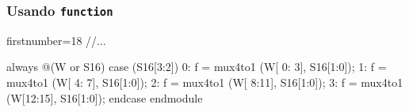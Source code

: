 \begin{frame}[fragile]
	\frametitle{Usando \texttt{function}}
	\begin{verilogcode*}{firstnumber=18}
//...
  
  always @(W or S16) 
    case (S16[3:2])
      0: f = mux4to1 (W[ 0: 3], S16[1:0]); 
      1: f = mux4to1 (W[ 4: 7], S16[1:0]); 
      2: f = mux4to1 (W[ 8:11], S16[1:0]); 
      3: f = mux4to1 (W[12:15], S16[1:0]);
    endcase 
endmodule
    \end{verilogcode*} 
\end{frame}


